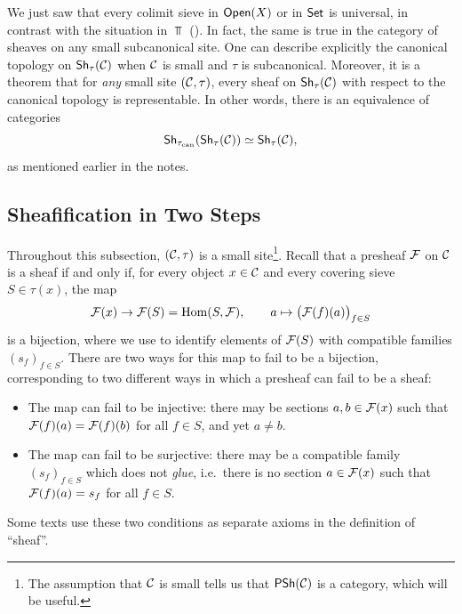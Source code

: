 \begin{remark}\label{remark:chap:sheaves:sec:sites:canonical topology on a category of sheaves}
    We just saw that every colimit sieve in $\Open(X)$ or in $\Set$ is universal, in contrast with the situation in $\Top$ (). In fact, the same is true in the category of sheaves on any small subcanonical site. One can describe explicitly the canonical topology on $\Sh_\tau(\catC)$ when $\catC$ is small and $\tau$ is subcanonical. Moreover, it is a theorem that for \emph{any} small site $(\catC,\tau)$, every sheaf on $\Sh_\tau(\catC)$ with respect to the canonical topology is representable. In other words, there is an equivalence of categories
    \[\Sh_{\tau_{\mathrm{can}}}(\Sh_\tau(\catC)) \simeq \Sh_\tau(\catC),\]
    as mentioned earlier in the notes.
\end{remark}

\subsection{Sheafification in Two Steps}

\startlecture[Oct 6, 2026]

Throughout this subsection, $(\catC,\tau)$ is a small site\footnote{The assumption that $\catC$ is small tells us that $\PSh(\catC)$ is a category, which will be useful.}. Recall that a presheaf $\cal{F}$ on $\catC$ is a sheaf if and only if, for every object $x \in \catC$ and every covering sieve $S \in \tau(x)$, the map
\[\cal{F}(x) \to \cal{F}(S) = \Hom(S,\cal{F}), \qquad a \mapsto \big(\cal{F}(f)(a)\big)_{f \in S}\]
is a bijection, where we use  to identify elements of $\cal{F}(S)$ with compatible families $(s_f)_{f \in S}$. There are two ways for this map to fail to be a bijection, corresponding to two different ways in which a presheaf can fail to be a sheaf:
\begin{itemize}
    \item The map can fail to be injective: there may be sections $a, b \in \cal{F}(x)$ such that $\cal{F}(f)(a) = \cal{F}(f)(b)$ for all $f \in S$, and yet $a \neq b$.
    \item The map can fail to be surjective: there may be a compatible family $(s_f)_{f \in S}$ which does not \emph{glue}, i.e.\ there is no section $a \in \cal{F}(x)$ such that $\cal{F}(f)(a) = s_f$ for all $f \in S$.
\end{itemize}
Some texts use these two conditions as separate axioms in the definition of ``sheaf''.

